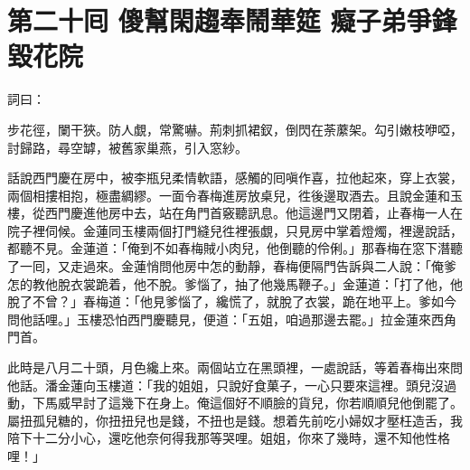 
\chapter*{第二十囘 傻幫閑趨奉鬧華筵 癡子弟爭鋒毀花院}


詞曰：

\begin{myquote} 
步花徑，闌干狹。防人覷，常驚嚇。荊刺抓裙釵，倒閃在荼䕷架。勾引嫩枝咿啞，討歸路，尋空罅，被舊家巢燕，引入窓紗。

\end{myquote} 

話說西門慶在房中，被李瓶兒柔情軟語，{}感觸的囘嗔作喜，拉他起來，穿上衣裳，兩個相摟相抱，極盡綢繆。一面令春梅進房放桌兒，徃後邊取酒去。且說金蓮和玉樓，從西門慶進他房中去，站在角門首竅聽訊息。他這邊門又閉着，止春梅一人在院子裡伺候。金蓮同玉樓兩個打門縫兒徃裡張覷，只見房中掌着燈燭，裡邊說話，都聽不見。金蓮道：「俺到不如春梅賊小肉兒，他倒聽的伶俐。」那春梅在窓下潛聽了一囘，又走過來。金蓮悄問他房中怎的動靜，春梅便隔門告訴與二人說：「俺爹怎的教他脫衣裳跪着，他不脫。爹惱了，抽了他幾馬鞭子。」金蓮道：「打了他，他脫了不曾？」春梅道：「他見爹惱了，纔慌了，就脫了衣裳，跪在地平上。爹如今問他話哩。」玉樓恐怕西門慶聽見，便道：「五姐，咱過那邊去罷。」{}拉金蓮來西角門首。

此時是八月二十頭，月色纔上來。兩個站立在黑頭裡，一處說話，等着春梅出來問他話。潘金蓮向玉樓道：「我的姐姐，只說好食菓子，一心只要來這裡。頭兒沒過動，下馬威早討了這幾下在身上。俺這個好不順臉的貨兒，你若順順兒他倒罷了。屬扭孤兒糖的，你扭扭兒也是錢，不扭也是錢。想着先前吃小婦奴才壓枉造舌，我陪下十二分小心，還吃他奈何得我那等哭哩。姐姐，你來了幾時，還不知他性格哩！」

